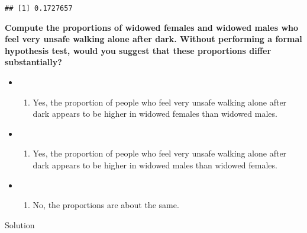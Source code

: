 \documentclass[
]{book}
\newenvironment{Shaded}{\begin{snugshade}}{\end{snugshade}}
\newcommand{\CommentTok}[1]{\textcolor[rgb]{0.56,0.35,0.01}{\textit{#1}}}
\newcommand{\FunctionTok}[1]{\textcolor[rgb]{0.13,0.29,0.53}{\textbf{#1}}}
\newcommand{\NormalTok}[1]{#1}
\newcommand{\OtherTok}[1]{\textcolor[rgb]{0.56,0.35,0.01}{#1}}
\newcommand{\SpecialCharTok}[1]{\textcolor[rgb]{0.81,0.36,0.00}{\textbf{#1}}}
\newcommand{\StringTok}[1]{\textcolor[rgb]{0.31,0.60,0.02}{#1}}
\providecommand{\tightlist}{%
  \setlength{\itemsep}{0pt}\setlength{\parskip}{0pt}}
\begin{document}
\begin{verbatim}
## [1] 0.1727657
\end{verbatim}

\textbf{Compute the proportions of widowed females and widowed males who feel very unsafe walking alone after dark. Without performing a formal hypothesis test, would you suggest that these proportions differ substantially?}

\begin{itemize}
\item
  \begin{enumerate}
  \def\labelenumi{(\Alph{enumi})}
  \tightlist
  \item
    Yes, the proportion of people who feel very unsafe walking alone after dark appears to be higher in widowed females than widowed males.\\
  \end{enumerate}
\item
  \begin{enumerate}
  \def\labelenumi{(\Alph{enumi})}
  \setcounter{enumi}{1}
  \tightlist
  \item
    Yes, the proportion of people who feel very unsafe walking alone after dark appears to be higher in widowed males than widowed females.\\
  \end{enumerate}
\item
  \begin{enumerate}
  \def\labelenumi{(\Alph{enumi})}
  \setcounter{enumi}{2}
  \tightlist
  \item
    No, the proportions are about the same.
  \end{enumerate}
\end{itemize}

Solution

\begin{Shaded}
\end{Shaded}
\end{document}
